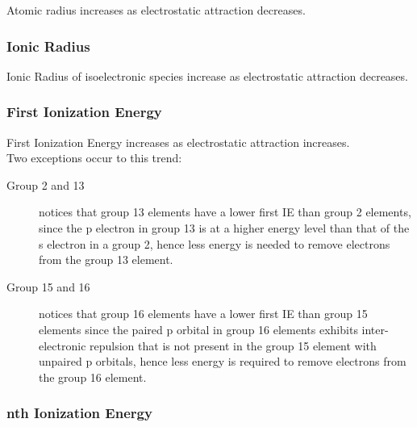 \documentclass[../main]{subfiles}
\begin{document}

	Atomic radius increases as electrostatic attraction decreases.

	\subsubsection{Ionic Radius}


	Ionic Radius of isoelectronic species increase as electrostatic attraction decreases.

	\subsubsection{First Ionization Energy}


	First Ionization Energy increases as electrostatic attraction increases. \\

	Two exceptions occur to this trend:

	\begin{description}
		\item[Group 2 and 13] notices that group 13 elements have a lower first IE than group 2 elements, since the p electron in group 13 is at a higher energy level than that of the s electron in a group 2, hence less energy is needed to remove electrons from the group 13 element.
		\item[Group 15 and 16] notices that group 16 elements have a lower first IE than group 15 elements since the paired p orbital in group 16 elements exhibits inter-electronic repulsion that is not present in the group 15 element with unpaired p orbitals, hence less energy is required to remove electrons from the group 16 element.
	\end{description}

	\subsubsection{nth Ionization Energy}
\end{document}
